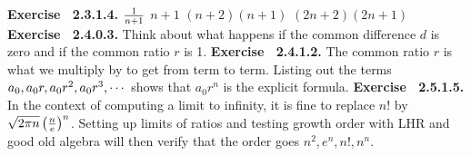 \par 
 {\noindent \protect \bf  Exercise ~2.3.1.4.} \textbullet $\protect \frac  {1}{n+1}$ \textbullet $n+1$ \textbullet $(n+2)(n+1)$ \textbullet $(2n+2)(2n+1)$ \protect \newline  \protect \newline  
 {\noindent \protect \bf  Exercise ~2.4.0.3.} Think about what happens if the common difference $d$ is zero and if the common ratio $r$ is 1. \protect \newline  \protect \newline  
 {\noindent \protect \bf  Exercise ~2.4.1.2.} The common ratio $r$ is what we multiply by to get from term to term. Listing out the terms $a_0, a_0r, a_0r^2, a_0r^3,\protect \cdots  $ shows that $a_0r^n$ is the explicit formula. \protect \newline  \protect \newline  
 {\noindent \protect \bf  Exercise ~2.5.1.5.} In the context of computing a limit to infinity, it is fine to replace $n!$ by $\protect \sqrt  {2\pi n} \left ( \protect \frac  {n}{e} \right )^n$. Setting up limits of ratios and testing growth order with LHR and good old algebra will then verify that the order goes $n^2,e^n,n!,n^n$. \protect \newline  \protect \newline  
